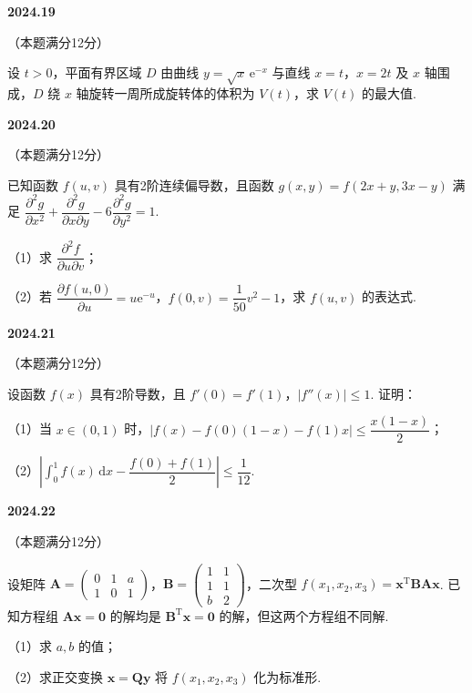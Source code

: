 \documentclass[UTF8,12pt,fontset=windows]{ctexart}
\begin{document}
\vfill
\newpage
{\large\bfseries 2024.19}

（本题满分12分）

设 $t>0$，平面有界区域 $D$ 由曲线 $y=\sqrt{x}\,\mathrm{e}^{-x}$ 与直线 $x=t$，$x=2t$ 及 $x$ 轴围成，$D$ 绕 $x$ 轴旋转一周所成旋转体的体积为 $V(t)$，求 $V(t)$ 的最大值.

\vfill
\newpage
{\large\bfseries 2024.20}

（本题满分12分）

已知函数 $f(u,v)$ 具有2阶连续偏导数，且函数 $g(x,y)=f(2x+y,3x-y)$ 满足 $\dfrac{\partial^2 g}{\partial x^2}+\dfrac{\partial^2 g}{\partial x\partial y}-6\dfrac{\partial^2 g}{\partial y^2}=1$.

（1）求 $\dfrac{\partial^2 f}{\partial u\partial v}$；

（2）若 $\dfrac{\partial f(u,0)}{\partial u}=u\mathrm{e}^{-u}$，$f(0,v)=\dfrac{1}{50}v^2-1$，求 $f(u,v)$ 的表达式.

\vfill
\newpage
{\large\bfseries 2024.21}

（本题满分12分）

设函数 $f(x)$ 具有2阶导数，且 $f'(0)=f'(1)$，$|f''(x)|\leqslant1$. 证明：

（1）当 $x\in(0,1)$ 时，$|f(x)-f(0)(1-x)-f(1)x|\leqslant\dfrac{x(1-x)}{2}$；

（2）$\left|\int_0^1f(x)\,\mathrm{d}x-\dfrac{f(0)+f(1)}{2}\right|\leqslant\dfrac{1}{12}$.

\vfill
\newpage
{\large\bfseries 2024.22}

（本题满分12分）

设矩阵 $\boldsymbol{A}=\begin{pmatrix}0&1&a\\1&0&1\end{pmatrix}$，$\boldsymbol{B}=\begin{pmatrix}1&1\\1&1\\b&2\end{pmatrix}$，二次型 $f(x_1,x_2,x_3)=\boldsymbol{x}^{\mathrm{T}}\boldsymbol{B}\boldsymbol{A}\boldsymbol{x}$. 已知方程组 $\boldsymbol{Ax}=\boldsymbol{0}$ 的解均是 $\boldsymbol{B}^{\mathrm{T}}\boldsymbol{x}=\boldsymbol{0}$ 的解，但这两个方程组不同解.

（1）求 $a,b$ 的值；

（2）求正交变换 $\boldsymbol{x}=\boldsymbol{Qy}$ 将 $f(x_1,x_2,x_3)$ 化为标准形.

\vfill
\end{document}
